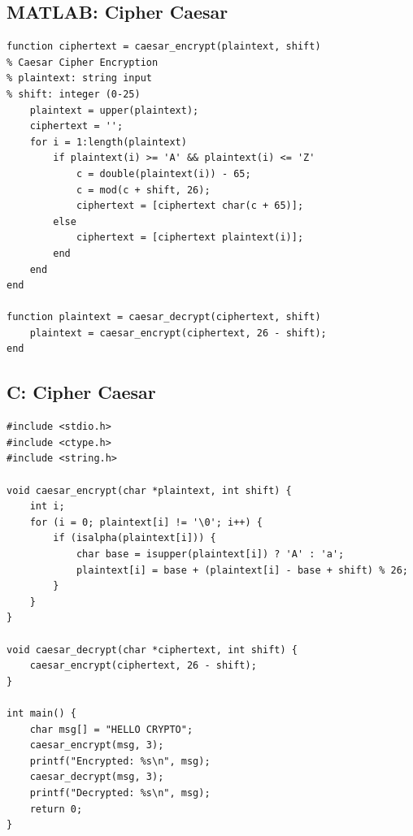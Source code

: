 \documentclass[12pt,a4paper]{article}
\begin{document}
\subsection{MATLAB: Cipher Caesar}
\begin{lstlisting}[style=matlab,caption={Implementasi Caesar Cipher dalam MATLAB}]
function ciphertext = caesar_encrypt(plaintext, shift)
% Caesar Cipher Encryption
% plaintext: string input
% shift: integer (0-25)
    plaintext = upper(plaintext);
    ciphertext = '';
    for i = 1:length(plaintext)
        if plaintext(i) >= 'A' && plaintext(i) <= 'Z'
            c = double(plaintext(i)) - 65;
            c = mod(c + shift, 26);
            ciphertext = [ciphertext char(c + 65)];
        else
            ciphertext = [ciphertext plaintext(i)];
        end
    end
end

function plaintext = caesar_decrypt(ciphertext, shift)
    plaintext = caesar_encrypt(ciphertext, 26 - shift);
end
\end{lstlisting}

\subsection{C: Cipher Caesar}
\begin{lstlisting}[style=cstyle,caption={Implementasi Caesar Cipher dalam C}]
#include <stdio.h>
#include <ctype.h>
#include <string.h>

void caesar_encrypt(char *plaintext, int shift) {
    int i;
    for (i = 0; plaintext[i] != '\0'; i++) {
        if (isalpha(plaintext[i])) {
            char base = isupper(plaintext[i]) ? 'A' : 'a';
            plaintext[i] = base + (plaintext[i] - base + shift) % 26;
        }
    }
}

void caesar_decrypt(char *ciphertext, int shift) {
    caesar_encrypt(ciphertext, 26 - shift);
}

int main() {
    char msg[] = "HELLO CRYPTO";
    caesar_encrypt(msg, 3);
    printf("Encrypted: %s\n", msg);
    caesar_decrypt(msg, 3);
    printf("Decrypted: %s\n", msg);
    return 0;
}
\end{lstlisting}
\end{document}
